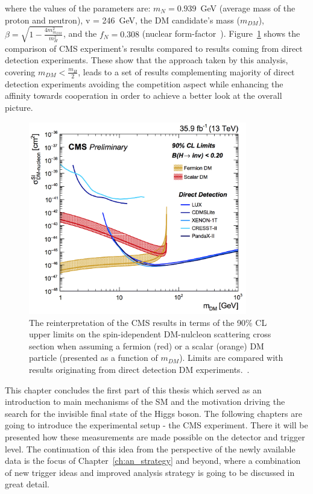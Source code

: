 where the values of the parameters are: $m_N = 0.939$~GeV (average mass of the proton and neutron), v = 246~GeV, the DM candidate's mass ($m_{DM}$), $\beta = \sqrt{1-\frac{4m_{m_{DM}}^2}{m_H^2}}$, and the $f_N=0.308$ (nuclear form-factor~\cite{paper:form_fact, paper:HIG_17_023}). Figure~\ref{fig:dm_2016} shows the comparison of CMS experiment's results compared to results coming from direct detection experiments. These show that the approach taken by this analysis, covering $m_{DM}<\frac{m_H}{2}$, leads to a set of results complementing majority of direct detection experiments avoiding the competition aspect while enhancing the affinity towards cooperation in order to achieve a better look at the overall picture.

  \begin{figure}[htbp]
    \begin{center}
        \includegraphics[width=0.85\textwidth]{Theory/DM2016.png}
        \caption{The reinterpretation of the CMS results in terms of the 90\% CL upper limits on the spin-idependent DM-nulcleon scattering cross section when assuming a fermion (red) or a scalar (orange) DM particle (presented as a function of $m_{DM}$). Limits are compared with results originating from direct detection DM experiments.~\cite{paper:HIG_17_023}.}
      \label{fig:dm_2016}
    \end{center}
  \end{figure}
  
\hspace{10pt} This chapter concludes the first part of this thesis which served as an introduction to main mechanisms of the SM and the motivation driving the search for the invisible final state of the Higgs boson. The following chapters are going to introduce the experimental setup - the CMS experiment. There it will be presented how these measurements are made possible on the detector and trigger level. The continuation of this idea from the perspective of the newly available data is the focus of Chapter~\ref{ch:an_strategy} and beyond, where a combination of new trigger ideas and improved analysis strategy is going to be discussed in great detail.